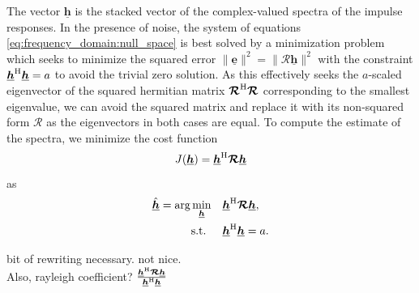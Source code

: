 \documentclass{article}
\newcommand{\hf}{\underline{\bm{h}}}
\newcommand{\Rf}{\bm{\mathcal{R}}}
\begin{document}
The vector \(\hf\) is the stacked vector of the complex-valued spectra of the impulse responses.
In the presence of noise, the system of equations \eqref{eq:frequency_domain:null_space} is best solved by a minimization problem which seeks to minimize the squared error \(\|\underline{\bm{e}} \|^2 = \| \Rf \hf \|^2\) 
with the constraint \(\hf^\herm \hf = a\) to avoid the trivial zero solution.
As this effectively seeks the \(a\)-scaled eigenvector of the squared hermitian matrix \(\Rf^\herm \Rf\) corresponding to the smallest eigenvalue, we can avoid the squared matrix and replace it with its non-squared form \(\Rf\) as the eigenvectors in both cases are equal.
To compute the estimate of the spectra, we minimize the cost function
\begin{equation}
    J(\hf) = \hf^\herm \Rf \hf\label{eq:frequency_domain:cost_function}
\end{equation}
as
\begin{align}
    \hat{\hf} = \arg \min_{\hf} \quad &\hf^\herm \Rf \hf, \label{eq:frequency_domain:min_prob}\\
    \text{s.t. } \quad &\hf^\herm \hf = a.
\end{align}
\begin{attention}
    bit of rewriting necessary. not nice.\\
    Also, rayleigh coefficient? \(\frac{\hf^\herm \Rf \hf}{\hf^\herm \hf}\)
\end{attention}
\end{document}
